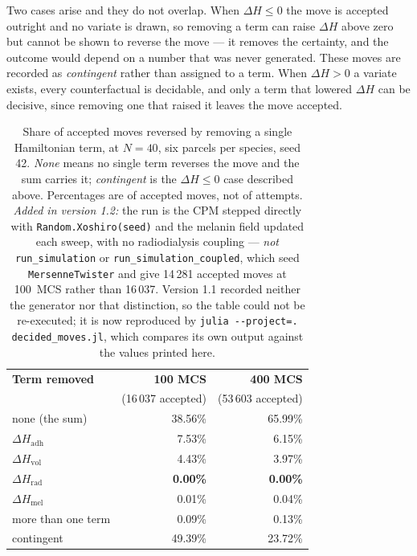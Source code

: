 \documentclass[11pt]{article}
\begin{document}
Two cases arise and they do not overlap. When $\Delta H \le 0$ the move is accepted outright and no
variate is drawn, so removing a term can raise $\Delta H$ above zero but cannot be shown to reverse
the move --- it removes the certainty, and the outcome would depend on a number that was never
generated. These moves are recorded as \emph{contingent} rather than assigned to a term. When
$\Delta H > 0$ a variate exists, every counterfactual is decidable, and only a term that lowered
$\Delta H$ can be decisive, since removing one that raised it leaves the move accepted.

\begin{table}[h!]
\centering
\small
\caption{Share of accepted moves reversed by removing a single Hamiltonian term, at $N=40$, six
parcels per species, seed 42. \emph{None} means no single term reverses the move and the sum
carries it; \emph{contingent} is the $\Delta H \le 0$ case described above. Percentages are of
accepted moves, not of attempts. \emph{Added in version 1.2:} the run is the CPM stepped directly
with \texttt{Random.Xoshiro(seed)} and the melanin field updated each sweep, with no radiodialysis
coupling --- \emph{not} \texttt{run\_simulation} or \texttt{run\_simulation\_coupled}, which seed
\texttt{MersenneTwister} and give 14\,281 accepted moves at 100~MCS rather than 16\,037. Version 1.1
recorded neither the generator nor that distinction, so the table could not be re-executed; it is
now reproduced by \texttt{julia -{}-project=. decided\_moves.jl}, which compares its own output
against the values printed here.}
\label{tab:decided_moves}
\begin{tabular}{@{}lrr@{}}
\toprule
\textbf{Term removed} & \textbf{100 MCS} & \textbf{400 MCS} \\
 & (16\,037 accepted) & (53\,603 accepted) \\
\midrule
none (the sum)                   & 38.56\% & 65.99\% \\
$\Delta H_{\mathrm{adh}}$        &  7.53\% &  6.15\% \\
$\Delta H_{\mathrm{vol}}$        &  4.43\% &  3.97\% \\
$\Delta H_{\mathrm{rad}}$        & \textbf{0.00\%} & \textbf{0.00\%} \\
$\Delta H_{\mathrm{mel}}$        &  0.01\% &  0.04\% \\
more than one term               &  0.09\% &  0.13\% \\
contingent                       & 49.39\% & 23.72\% \\
\bottomrule
\end{tabular}
\end{table}
\end{document}
